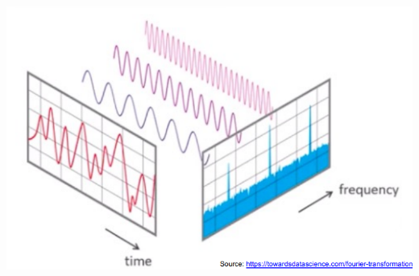 \documentclass[11pt]{article}
\begin{document}
\begin{itemize}
    \includegraphics[width=\textwidth]{fourier-analysis-3.png}


\end{itemize}
\end{document}

